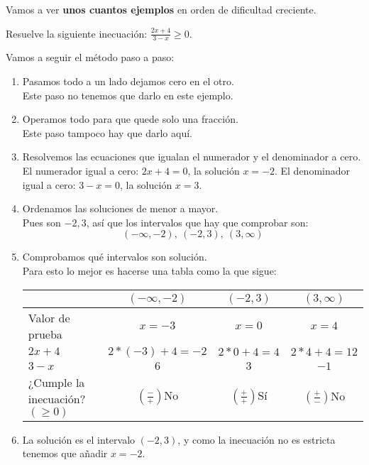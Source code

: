 \documentclass[a4paper,11pt,answers]{exam}
\begin{document}
Vamos a ver \textbf{unos cuantos ejemplos} en orden de dificultad creciente.
\begin{questions}
\question Resuelve la siguiente inecuación: $\frac{2x + 4}{3 - x} \geq 0$.
  \begin{solution}
    Vamos a seguir el método paso a paso:
    \begin{enumerate}
    \item Pasamos todo a un lado dejamos cero en el otro.\\
      Este paso no tenemos que darlo en este ejemplo.
    \item Operamos todo para que quede solo una fracción.\\
      Este paso tampoco hay que darlo aquí.
    \item Resolvemos las ecuaciones que igualan el numerador y el denominador a cero.\\
      El numerador igual a cero: $2x + 4 = 0$, la solución $x = -2$.
      El denominador igual a cero: $3 -x = 0$, la solución $x = 3$.
    \item Ordenamos las soluciones de menor a mayor.\\
      Pues son {$-2, 3$}, así que los intervalos que hay que comprobar son:\\
      \[(-\infty, -2),\ (-2, 3),\ (3, \infty)\]
    \item Comprobamos qué intervalos son solución.\\
      Para esto lo mejor es hacerse una tabla como la que sigue:
      \begin{center}
        \begin{tabular}{l|c|c|c|}
          &$(-\infty, -2)$&$(-2,3)$&$(3,\infty)$\\
          \hline
          Valor de prueba&$x = -3$&$x = 0$&$x= 4$\\
          \hline
          $2x+4$&$2*(-3) + 4 = -2$&$2*0 + 4 = 4$&$2*4+4 = 12$\\
          \hline
          $3-x$&$6$&$3$&$-1$\\
          \hline
          ¿Cumple la inecuación? $\scriptstyle (\geq 0)$&$\scriptstyle (\frac{-}{+})$No
                          &$\scriptstyle (\frac{+}{+})$Sí
                                   &$\scriptstyle (\frac{+}{-})$No
        \end{tabular}
      \end{center}
    \item La solución es el intervalo $(-2, 3)$, y como la inecuación no es estricta tenemos que añadir
      $x = -2$.

\end{enumerate}
\end{solution}
\end{questions}
\end{document}
